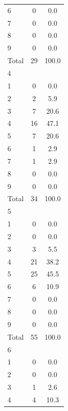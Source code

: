 {\begin{tabular}{l*{1}{cc}}
6           &           0&         0.0\\
7           &           0&         0.0\\
8           &           0&         0.0\\
9           &           0&         0.0\\
Total       &          29&       100.0\\
\hline
4           &            &            \\
1           &           0&         0.0\\
2           &           2&         5.9\\
3           &           7&        20.6\\
4           &          16&        47.1\\
5           &           7&        20.6\\
6           &           1&         2.9\\
7           &           1&         2.9\\
8           &           0&         0.0\\
9           &           0&         0.0\\
Total       &          34&       100.0\\
\hline
5           &            &            \\
1           &           0&         0.0\\
2           &           0&         0.0\\
3           &           3&         5.5\\
4           &          21&        38.2\\
5           &          25&        45.5\\
6           &           6&        10.9\\
7           &           0&         0.0\\
8           &           0&         0.0\\
9           &           0&         0.0\\
Total       &          55&       100.0\\
\hline
6           &            &            \\
1           &           0&         0.0\\
2           &           0&         0.0\\
3           &           1&         2.6\\
4           &           4&        10.3\\

\end{tabular}}
